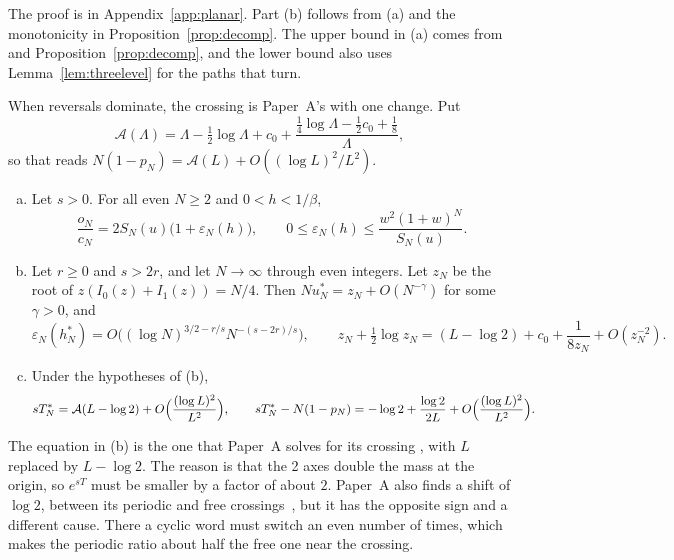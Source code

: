 The proof is in Appendix~\ref{app:planar}. Part (b) follows from (a) and the monotonicity in
Proposition~\ref{prop:decomp}. The upper bound in (a) comes from \cite[Eq.~(6)]{paperA} and
Proposition~\ref{prop:decomp}, and the lower bound also uses Lemma~\ref{lem:threelevel} for the
paths that turn.

When reversals dominate, the crossing is Paper~A's with one change. Put
\[
 \mathcal A(\Lambda)=\Lambda-\tfrac12\log\Lambda+c_0
 +\frac{\frac14\log\Lambda-\frac12c_0+\frac18}{\Lambda},
\]
so that \cite[Eq.~(8)]{paperA} reads $N(1-p_N)=\mathcal A(L)+O((\log L)^2/L^2)$.

\begin{theorem}\label{thm:planar-rev}
\begin{enumerate}[(a)]
\item Let $s>0$. For all even $N\ge2$ and $0<h<1/\beta$,
\[
 \frac{o_N}{c_N}=2S_N(u)\bigl(1+\varepsilon_N(h)\bigr),\qquad
 0\le\varepsilon_N(h)\le\frac{w^2(1+w)^N}{S_N(u)}.
\]
\item Let $r\ge0$ and $s>2r$, and let $N\to\infty$ through even integers. Let $z_N$ be the root of
$z(I_0(z)+I_1(z))=N/4$. Then $Nu^*_N=z_N+O(N^{-\gamma})$ for some $\gamma>0$, and
\[
 \varepsilon_N(h^*_N)=O\bigl((\log N)^{3/2-r/s}N^{-(s-2r)/s}\bigr),\qquad
 z_N+\tfrac12\log z_N=(L-\log2)+c_0+\frac1{8z_N}+O(z_N^{-2}).
\]
\item Under the hypotheses of (b),
\[
 sT^*_N=\mathcal A(L-\log2)+O\Bigl(\frac{(\log L)^2}{L^2}\Bigr),\qquad
 sT^*_N-N(1-p_N)=-\log2+\frac{\log2}{2L}+O\Bigl(\frac{(\log L)^2}{L^2}\Bigr).
\]
\end{enumerate}
\end{theorem}

The equation in (b) is the one that Paper~A solves for its crossing
\cite[proof of Thm.~5.2]{paperA}, with $L$ replaced by $L-\log2$. The reason is that the 2 axes
double the mass at the origin, so $e^{sT}$ must be smaller by a factor of about $2$. Paper~A also
finds a shift of $\log2$, between its periodic and free crossings~\cite[Thm.~7.2]{paperA}, but it
has the opposite sign and a different cause. There a cyclic word must switch an even number of
times, which makes the periodic ratio about half the free one near the crossing.

